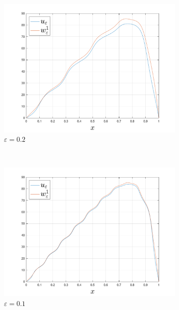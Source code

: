 \begin{example}
	\begin{figure}[h!tb]
    \centering
    \begin{subfigure}[b]{0.5\textwidth}
        \includegraphics[width=\textwidth]{src/img/u_eps_w_1_eps_1.pdf}
        \caption{$\varepsilon = 0.2$}
    \end{subfigure}
    ~ %
    \begin{subfigure}[b]{0.5\textwidth}
        \includegraphics[width=\textwidth]{src/img/u_eps_w_1_eps_2.pdf}
        \caption{$\varepsilon = 0.1$}
    \end{subfigure}
    \begin{subfigure}[b]{0.5\textwidth}

\end{subfigure}
\end{figure}
\end{example}
